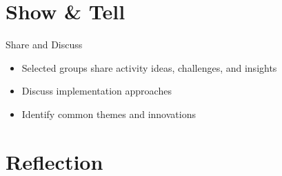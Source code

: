 \documentclass[xcolor=dvipsnames, aspectratio=169]{beamer}
\newcommand{\footername}{AI in Programming Education}
\newcommand{\setfooter}[2]{\renewcommand{\footername}{\href{#2}{#1}}}
\begin{document}
\section{Show \& Tell}
\setfooter{Discussion and Reflection}{https://github.com/neu-ece-esl/ai-prog-workshop}

\begin{frame}{Share and Discuss}
  \begin{itemize}
    \item Selected groups share activity ideas, challenges, and insights
    \item Discuss implementation approaches
    \item Identify common themes and innovations
  \end{itemize}
\end{frame}

\section{Reflection}
\setfooter{Discussion and Reflection}{https://github.com/neu-ece-esl/ai-prog-workshop}

\end{document}
